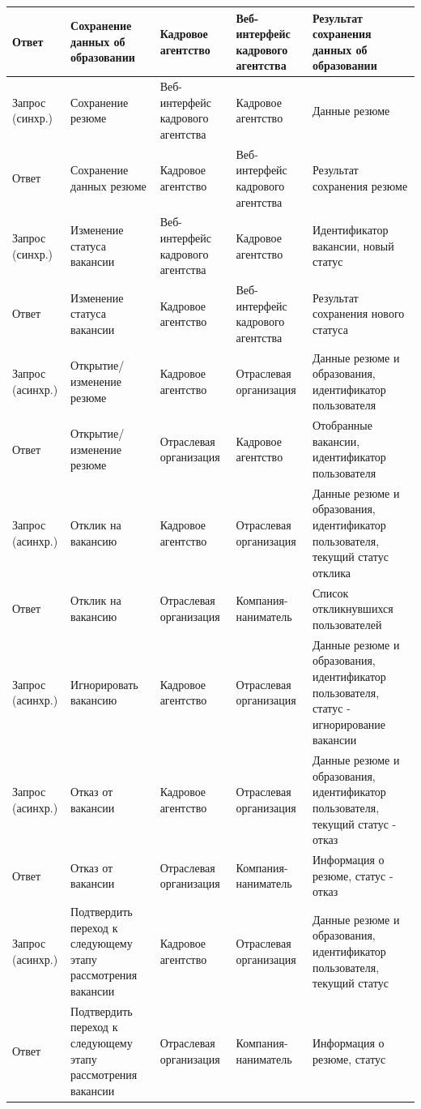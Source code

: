 \begin{longtable}[ht]{|p{}|p{3cm}|p{3cm}|p{3cm}|p{}|}
\hline
Ответ	& Сохранение данных об образовании	& Кадровое агентство & Веб-интерфейс кадрового агентства	& Результат сохранения данных об образовании\\
\hline
Запрос (синхр.)	& Сохранение резюме & Веб-интерфейс кадрового агентства 	& Кадровое агентство	& Данные резюме\\
\hline
Ответ	& Сохранение данных резюме	& Кадровое агентство & Веб-интерфейс кадрового агентства	& Результат сохранения резюме\\
\hline
Запрос (синхр.)	& Изменение статуса вакансии & Веб-интерфейс кадрового агентства 	& Кадровое агентство	& Идентификатор вакансии, новый статус\\
\hline
Ответ	& Изменение статуса вакансии	& Кадровое агентство & Веб-интерфейс кадрового агентства	& Результат сохранения нового статуса\\
\hline
Запрос (асинхр.)	& Открытие/изменение резюме & Кадровое агентство & Отраслевая организация	& Данные резюме и образования, идентификатор пользователя\\
\hline
Ответ	& Открытие/изменение резюме & Отраслевая организация & Кадровое агентство	& Отобранные вакансии, идентификатор пользователя\\
\hline
Запрос (асинхр.)	& Отклик на вакансию & Кадровое агентство & Отраслевая организация	& Данные резюме и образования, идентификатор пользователя, текущий статус отклика\\
\hline
Ответ	& Отклик на вакансию  & Отраслевая организация & Компания- наниматель	& Список откликнувшихся пользователей\\
\hline
Запрос (асинхр.)	& Игнорировать вакансию & Кадровое агентство & Отраслевая организация	& Данные резюме и образования, идентификатор пользователя, статус - игнорирование вакансии\\
\hline
Запрос (асинхр.)	& Отказ от вакансии & Кадровое агентство & Отраслевая организация	& Данные резюме и образования, идентификатор пользователя, текущий статус - отказ\\
\hline
Ответ	& Отказ от вакансии  & Отраслевая организация & Компания- наниматель & Информация о резюме, статус - отказ\\
\hline
Запрос (асинхр.)	& Подтвердить переход к следующему этапу рассмотрения вакансии & Кадровое агентство & Отраслевая организация	& Данные резюме и образования, идентификатор пользователя, текущий статус\\
\hline
Ответ	& Подтвердить переход к следующему этапу рассмотрения вакансии  & Отраслевая организация & Компания- наниматель & Информация о резюме, статус\\

\end{longtable}
